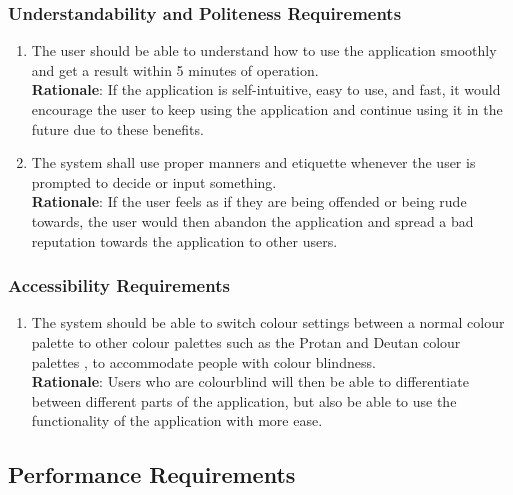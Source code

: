 \subsubsection{Understandability and Politeness Requirements}
\label{ssub:understandability_and_politeness_requirements}
\begin{enumerate}[{UH-UP}1. ]
	\item The user should be able to understand how to use the application smoothly and get a result within 5 minutes of operation.\\ \textbf{Rationale}: If the application is self-intuitive, easy to use, and fast, it would encourage the user to keep using the application and continue using it in the future due to these benefits.
	\item The system shall use proper manners and etiquette whenever the user is prompted to decide or input something.\\ \textbf{Rationale}: If the user feels as if they are being offended or being rude towards, the user would then abandon the application and spread a bad reputation towards the application to other users.
\end{enumerate}


\subsubsection{Accessibility Requirements}
\label{ssub:accessibility_requirements}
\begin{enumerate}[{UH-A}1. ]
	\item The system should be able to switch colour settings between a normal colour palette to other colour palettes such as the Protan and Deutan colour palettes \cite{EnChroma2025}, to accommodate people with colour blindness.
	\\ \textbf{Rationale}: Users who are colourblind will then be able to differentiate between different parts of the application, but also be able to use the functionality of the application with more ease.
	
\end{enumerate}


\subsection{Performance Requirements}
\label{sub:performance_requirements}

